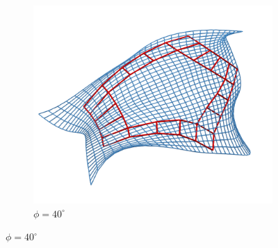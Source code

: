 \documentclass[9pt,academicons]{article}
\begin{document}
\begin{figure}[!ht]
{    \begin{subfigure}{.28\textwidth}
      \includegraphics[width=\textwidth]{images/rotations/40.png}
      \caption{$\phi=40^\circ$}
    \end{subfigure}
    \hfill
  }


\end{figure}
\end{document}
